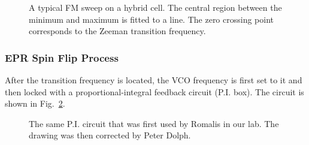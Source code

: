 \begin{figure}[t!]
	\centering
	\caption{{ A typical FM sweep on a hybrid cell. The central region between the minimum and maximum is fitted to a line. The zero crossing point corresponds to the Zeeman transition frequency.}}
	\label{fmsweep}
\end{figure}

\subsubsection{EPR Spin Flip Process}

After the transition frequency is located, the VCO frequency is first set to it and then locked with a proportional-integral feedback circuit (P.I. box). The circuit is shown in Fig.~\ref{PIBox}. 

\begin{figure}[t!]
	\centering
	\caption{{ The same P.I. circuit that was first used by Romalis in our lab. The drawing was then corrected by Peter Dolph.\cite{PeterThesis}}}
	\label{PIBox}
\end{figure}

